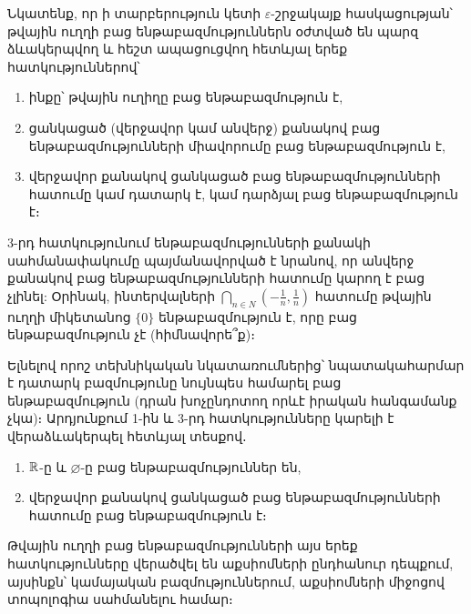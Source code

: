 \documentclass[./main.tex]{subfiles}
\begin{document}
\par Նկատենք, որ ի տարբերություն կետի $\varepsilon$-շրջակայք հասկացության՝ թվային ուղղի բաց ենթաբազմություններն օժտված են պարզ ձևակերպվող և հեշտ ապացուցվող հետևյալ երեք հատկություններով՝
\begin{enumerate}
    \item ինքը՝ թվային ուղիղը բաց ենթաբազմություն է,
    \item ցանկացած (վերջավոր կամ անվերջ) քանակով բաց ենթաբազմությունների միավորումը բաց ենթաբազմություն է,
    \item վերջավոր քանակով ցանկացած բաց ենթաբազմությունների հատումը կամ դա\-տարկ է, կամ դարձյալ բաց ենթաբազմություն է։
\end{enumerate}

\par 3-րդ հատկությունում ենթաբազմությունների քանակի սահմանափակումը
պայմանավորված է նրանով, որ անվերջ քանակով բաց ենթաբազմությունների հատումը կարող է բաց չլինել: Օրինակ, ինտերվալների $\bigcap_{n \in N} (-\frac{1}{n}, \frac{1}{n})$ հատումը թվային ուղղի միկետանոց $\{0\}$ ենթաբազմություն է, որը բաց ենթաբազմություն չէ (հիմնավորե՞ք)։

\par Ելնելով որոշ տեխնիկական նկատառումներից՝ նպատակահարմար է դատարկ բազմությունը նույնպես համարել բաց ենթաբազմություն (դրան խոչընդոտող որևէ իրական հանգամանք չկա)։ Արդյունքում 1-ին և 3-րդ հատկությունները կարելի է վերաձևակերպել հետևյալ տեսքով․

\begin{enumerate}
    \item $\mathbb{R}$-ը և  $\varnothing$-ը բաց ենթաբազմություններ են,
    \item[3.] վերջավոր քանակով ցանկացած բաց ենթաբազմությունների հատումը բաց ենթաբազմություն է։
\end{enumerate}

Թվային ուղղի բաց ենթաբազմությունների այս երեք հատկությունները վերածվել են աքսիոմների ընդհանուր դեպքում, այսինքն՝ կամայական բազմություններում, աքսի\-ոմ\-ների միջոցով տոպոլոգիա սահմանելու համար։
\end{document}
